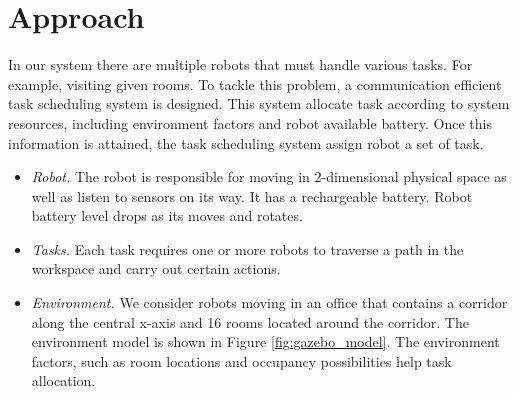\chapter{Approach}


In our system there are multiple robots that must handle various tasks. For example, visiting given rooms. To tackle this problem, a communication efficient task scheduling system is designed. 
This system allocate task according to system resources, including environment factors and robot available battery. Once this information is attained, the task scheduling system assign robot a set of task.
\begin{itemize}
	\item \textsl{Robot.} The robot is responsible for moving in 2-dimensional physical space as well as listen to sensors on its way. It has a rechargeable battery. Robot battery level drops as its moves and rotates.
	\item \textsl{Tasks.} Each task requires one or more robots to traverse a path in the workspace and carry out certain actions.
	\item \textsl{Environment.} We consider robots moving in an office that contains a corridor along the central x-axis and 16 rooms located around the corridor. The environment model is shown in Figure \ref{fig:gazebo_model}. The environment factors, such as room locations and occupancy possibilities help task allocation.
\end{itemize}

